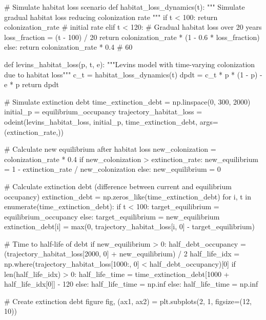 \documentclass[11pt,a4paper]{article}
\begin{document}
\begin{pycode}
# Simulate habitat loss scenario
def habitat_loss_dynamics(t):
    """
    Simulate gradual habitat loss reducing colonization rate
    """
    if t < 100:
        return colonization_rate  # initial rate
    elif t < 120:
        # Gradual habitat loss over 20 years
        loss_fraction = (t - 100) / 20
        return colonization_rate * (1 - 0.6 * loss_fraction)
    else:
        return colonization_rate * 0.4  # 60%

def levins_habitat_loss(p, t, e):
    """Levins model with time-varying colonization due to habitat loss"""
    c_t = habitat_loss_dynamics(t)
    dpdt = c_t * p * (1 - p) - e * p
    return dpdt

# Simulate extinction debt
time_extinction_debt = np.linspace(0, 300, 2000)
initial_p = equilibrium_occupancy
trajectory_habitat_loss = odeint(levins_habitat_loss, initial_p, time_extinction_debt,
                                args=(extinction_rate,))

# Calculate new equilibrium after habitat loss
new_colonization = colonization_rate * 0.4
if new_colonization > extinction_rate:
    new_equilibrium = 1 - extinction_rate / new_colonization
else:
    new_equilibrium = 0

# Calculate extinction debt (difference between current and equilibrium occupancy)
extinction_debt = np.zeros_like(time_extinction_debt)
for i, t in enumerate(time_extinction_debt):
    if t < 100:
        target_equilibrium = equilibrium_occupancy
    else:
        target_equilibrium = new_equilibrium
    extinction_debt[i] = max(0, trajectory_habitat_loss[i, 0] - target_equilibrium)

# Time to half-life of debt
if new_equilibrium > 0:
    half_debt_occupancy = (trajectory_habitat_loss[2000, 0] + new_equilibrium) / 2
    half_life_idx = np.where(trajectory_habitat_loss[1000:, 0] < half_debt_occupancy)[0]
    if len(half_life_idx) > 0:
        half_life_time = time_extinction_debt[1000 + half_life_idx[0]] - 120
    else:
        half_life_time = np.inf
else:
    half_life_time = np.inf

# Create extinction debt figure
fig, (ax1, ax2) = plt.subplots(2, 1, figsize=(12, 10))


\end{pycode}
\end{document}

